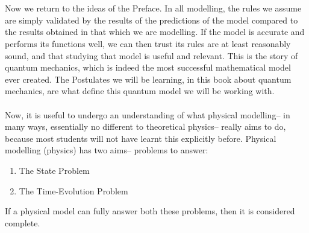 \\\\
Now we return to the ideas of the Preface. In all modelling, the rules we assume are simply validated by the results of the predictions of the model compared to the results obtained in that which we are modelling. If the model is accurate and performs its functions well, we can then trust its rules are at least reasonably sound, and that studying that model is useful and relevant. This is the story of quantum mechanics, which is indeed the most successful mathematical model ever created. The Postulates we will be learning, in this book about quantum mechanics, are what define this quantum model we will be working with.
\\\\
Now, it is useful to undergo an understanding of what physical modelling-- in many ways, essentially no different to theoretical physics-- really aims to do, because most students will not have learnt this explicitly before. Physical modelling (physics) has two aims-- problems to answer:
\begin{enumerate}
    \item The State Problem
    \item The Time-Evolution Problem
\end{enumerate}
If a physical model can fully answer both these problems, then it is considered complete.
